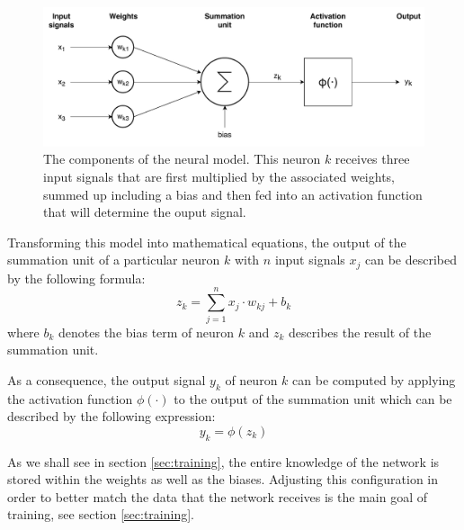 \begin{figure}[h]
  \centering
  \includegraphics[width=\textwidth]{../figures/single_neuron}
  \caption{The components of the neural model. This neuron
    \(k\) receives three input signals that are first multiplied by
    the associated weights, summed up including a bias and then fed
    into an activation function that will determine the ouput signal.}
  \label{fig:single-neuron}
\end{figure}
Transforming this model into mathematical equations, the output of the
summation unit of a particular
neuron \(k\) with \(n\) input signals \(x_j\) can be described by the
following formula:
\begin{equation}
  \label{eq:input}
  z_k = \sum_{j=1}^{n}{x_j \cdot w_{kj}} + b_k
\end{equation}
where \(b_k\) denotes the bias term of neuron \(k\) and \(z_k\) describes the
result of the summation unit.

As a consequence, the output signal \(y_k\) of neuron \(k\) can be computed by
applying the activation function \(\phi(\cdot)\) to the output of the
summation unit which can be described by the following expression:
\begin{equation}
  \label{eq:output}
  y_k = \phi(z_k)
\end{equation}

As we shall see in section \ref{sec:training},
the entire knowledge of the network is stored within the weights as
well as the biases. Adjusting this configuration in order to better
match the data that the network receives is the main goal of training,
see section \ref{sec:training}.

